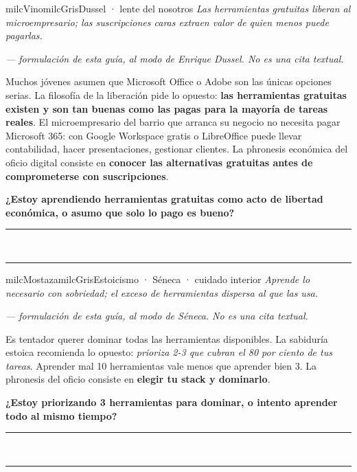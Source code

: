 \documentclass[11pt,letterpaper]{article}
\newcommand{\linead}[1]{\noindent\color{milcLinea}\rule{#1}{0.5pt}\color{milcNegro}}
\begin{document}
\begin{softbox}{milcVino}{milcGris}{Dussel · lente del nosotros}
\textit{Las herramientas gratuitas liberan al microempresario; las suscripciones caras extraen valor de quien menos puede pagarlas.}

{\footnotesize\itshape\color{milcNegro!70}--- formulación de esta guía, al modo de Enrique Dussel. No es una cita textual.}

Muchos jóvenes asumen que Microsoft Office o Adobe son las únicas opciones serias. La filosofía de la liberación pide lo opuesto: \textbf{las herramientas gratuitas existen y son tan buenas como las pagas para la mayoría de tareas reales}. El microempresario del barrio que arranca su negocio no necesita pagar Microsoft 365: con Google Workspace gratis o LibreOffice puede llevar contabilidad, hacer presentaciones, gestionar clientes. La phronesis económica del oficio digital consiste en \textbf{conocer las alternativas gratuitas antes de comprometerse con suscripciones}.

\textbf{¿Estoy aprendiendo herramientas gratuitas como acto de libertad económica, o asumo que solo lo pago es bueno?}
\end{softbox}
\linead{\linewidth}\\[1mm]
\linead{\linewidth}

\begin{softbox}{milcMostaza}{milcGris}{Estoicismo · Séneca · cuidado interior}
\textit{Aprende lo necesario con sobriedad; el exceso de herramientas dispersa al que las usa.}

{\footnotesize\itshape\color{milcNegro!70}--- formulación de esta guía, al modo de Séneca. No es una cita textual.}

Es tentador querer dominar todas las herramientas disponibles. La sabiduría estoica recomienda lo opuesto: \emph{prioriza 2-3 que cubran el 80 por ciento de tus tareas}. Aprender mal 10 herramientas vale menos que aprender bien 3. La phronesis del oficio consiste en \textbf{elegir tu stack y dominarlo}.

\textbf{¿Estoy priorizando 3 herramientas para dominar, o intento aprender todo al mismo tiempo?}
\end{softbox}
\linead{\linewidth}\\[1mm]
\linead{\linewidth}
\end{document}
